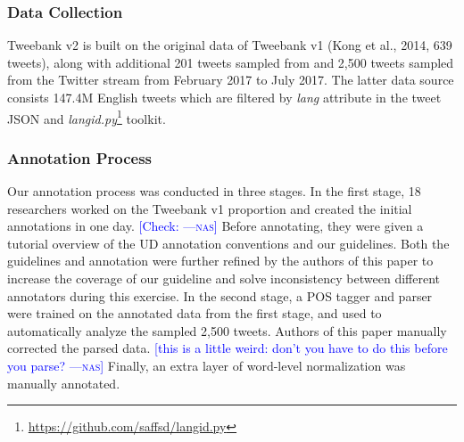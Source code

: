 \documentclass[11pt,a4paper]{article}
\newcommand{\nascomment}[1]{\textcolor{blue}{[#1 ---\textsc{nas}]}}
\begin{document}
\subsubsection{Data Collection}
{\sc Tweebank v2} is built on the original data of {\sc Tweebank v1} (Kong et al., 2014, 639 tweets), along with additional 201 tweets sampled from  and 2,500 tweets sampled  from the Twitter stream from February 2017 to July 2017.
The latter data source consists 147.4M English tweets which are filtered by {\it lang} attribute in the tweet JSON and {\it langid.py}\footnote{\url{https://github.com/saffsd/langid.py}} toolkit.

\subsubsection{Annotation Process}
Our annotation process was conducted in three stages.
In the first stage, 18 researchers worked on the {\sc Tweebank v1}
proportion and created the initial annotations in one day.
\nascomment{Check:} Before annotating, they were given a tutorial overview of the UD
annotation conventions and our guidelines.
Both the guidelines and annotation
were further refined by the authors of this paper to increase
the coverage of our guideline and solve inconsistency between
different annotators during this exercise. In the second stage, a POS tagger and
parser were trained on the annotated data from the first stage,
and used to automatically analyze the sampled 2,500 tweets.  Authors 
of this paper manually corrected the parsed data. \nascomment{this is
  a little weird:  don't you have to do this before you parse?} Finally, an extra
layer of word-level normalization was manually annotated.
\end{document}
